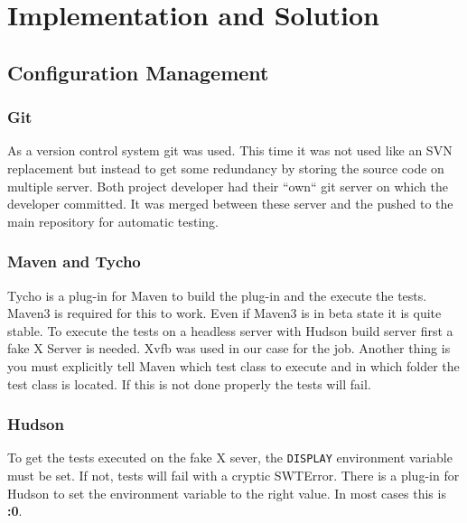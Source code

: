 \chapter{Implementation and Solution}
\thispagestyle{fancy}

\section{Configuration Management}

\subsection{Git}

As a version control system git was used. This time it was not used like an SVN
replacement but instead to get some redundancy by storing the source code on
multiple server. Both project developer had their ``own`` git server on which
the developer committed. It was merged between these server and the pushed to
the main repository for automatic testing.

\subsection{Maven and Tycho}

Tycho is a plug-in for Maven to build the plug-in and the execute the tests.
Maven3 is required for this to work. Even if Maven3 is in beta state it is
quite stable.\newline
To execute the tests on a headless server with Hudson build server first a fake
X Server is needed. Xvfb was used in our case for the job.
Another thing is you must explicitly tell Maven which test class to execute and
in which folder the test class is located. If this is not done properly the
tests will fail.

\subsection{Hudson}

To get the tests executed on the fake X sever, the \texttt{DISPLAY} environment
variable must be set. If not, tests will fail with a cryptic
SWTError.\newline
There is a plug-in for Hudson to set the environment variable to
the right value. In most cases this is \textbf{:0}.
